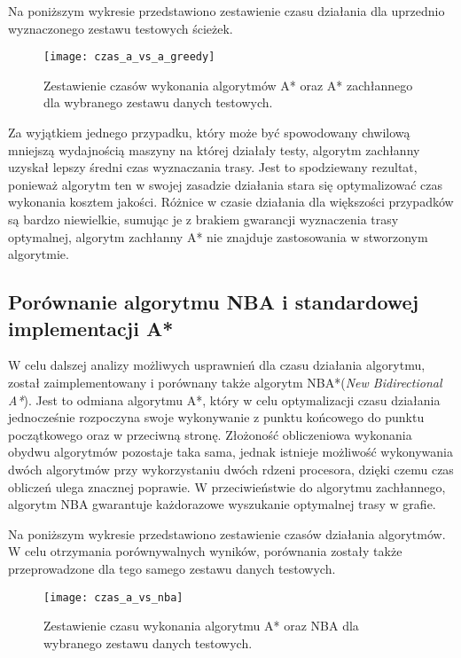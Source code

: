 Na poniższym wykresie przedstawiono zestawienie czasu działania dla uprzednio wyznaczonego zestawu testowych ścieżek.

\begin{figure}[H]
\centering
\texttt{[image: czas\_a\_vs\_a\_greedy]}
\caption{Zestawienie czasów wykonania algorytmów A* oraz A* zachłannego dla wybranego zestawu danych testowych.}
\end{figure}

Za wyjątkiem jednego przypadku, który może być spowodowany chwilową mniejszą wydajnością maszyny na której działały testy, algorytm zachłanny uzyskał lepszy średni czas wyznaczania trasy. Jest to spodziewany rezultat, ponieważ algorytm ten w swojej zasadzie działania stara się optymalizować czas wykonania kosztem jakości. Różnice w czasie działania dla większości przypadków są bardzo niewielkie, sumując je z brakiem gwarancji wyznaczenia trasy optymalnej, algorytm zachłanny A* nie znajduje zastosowania w stworzonym algorytmie.

\subsection{Porównanie algorytmu NBA i standardowej implementacji A*}

W celu dalszej analizy możliwych usprawnień dla czasu działania algorytmu, został zaimplementowany i porównany także algorytm NBA*(\textit{New Bidirectional A*}). Jest to odmiana algorytmu A*, który w celu optymalizacji czasu działania jednocześnie rozpoczyna swoje wykonywanie z punktu końcowego do punktu początkowego oraz w przeciwną stronę. Złożoność obliczeniowa wykonania obydwu algorytmów pozostaje taka sama, jednak istnieje możliwość wykonywania dwóch algorytmów przy wykorzystaniu dwóch rdzeni procesora, dzięki czemu czas obliczeń ulega znacznej poprawie. W przeciwieństwie do algorytmu zachłannego, algorytm NBA gwarantuje każdorazowe wyszukanie optymalnej trasy w grafie.

Na poniższym wykresie przedstawiono zestawienie czasów działania algorytmów. W celu otrzymania porównywalnych wyników, porównania zostały także przeprowadzone dla tego samego zestawu danych testowych.

\begin{figure}[H]
\centering
\texttt{[image: czas\_a\_vs\_nba]}
\caption{Zestawienie czasu wykonania algorytmu A* oraz NBA dla wybranego zestawu danych testowych.}
\end{figure}

